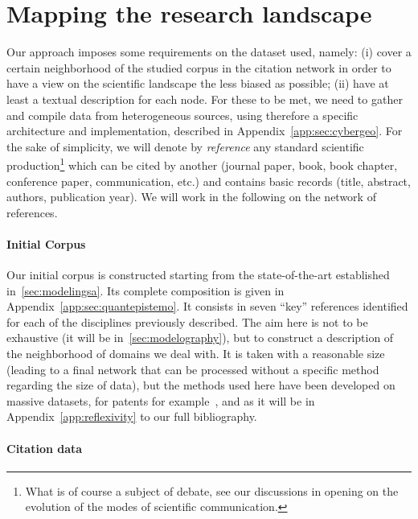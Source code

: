 \documentclass[galley]{jtlu-article-2col}
\begin{document}
\section{Mapping the research landscape}

Our approach imposes some requirements on the dataset used, namely: (i) cover a certain neighborhood of the studied corpus in the citation network in order to have a view on the scientific landscape the less biased as possible; (ii) have at least a textual description for each node. For these to be met, we need to gather and compile data from heterogeneous sources, using therefore a specific architecture and implementation, described in Appendix~\ref{app:sec:cybergeo}. For the sake of simplicity, we will denote by \emph{reference} any standard scientific production\footnote{What is of course a subject of debate, see our discussions in opening on the evolution of the modes of scientific communication.} which can be cited by another (journal paper, book, book chapter, conference paper, communication, etc.) and contains basic records (title, abstract, authors, publication year). We will work in the following on the network of references.


\paragraph{Initial Corpus}

Our initial corpus is constructed starting from the state-of-the-art established in~\ref{sec:modelingsa}. Its complete composition is given in Appendix~\ref{app:sec:quantepistemo}. It consists in seven ``key'' references identified for each of the disciplines previously described. The aim here is not to be exhaustive (it will be in~\ref{sec:modelography}), but to construct a description of the neighborhood of domains we deal with. It is taken with a reasonable size (leading to a final network that can be processed without a specific method regarding the size of data), but the methods used here have been developed on massive datasets, for patents for example~\cite{bergeaud2017classifying}, and as it will be in Appendix~\ref{app:reflexivity} to our full bibliography.



\paragraph{Citation data}
\end{document}
